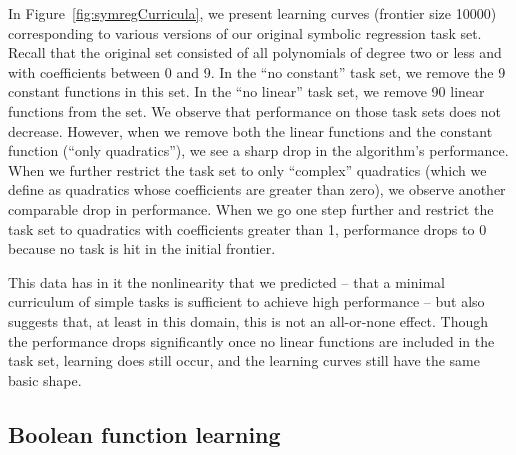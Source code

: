 \documentclass{article}
\begin{document}
In Figure~\ref{fig:symregCurricula}, we present learning curves
(frontier size 10000) corresponding to various versions of our
original symbolic regression task set. Recall that the original set
consisted of all polynomials of degree two or less and with
coefficients between 0 and 9. In the ``no constant'' task set, we
remove the 9 constant functions in this set. In the ``no linear'' task
set, we remove 90 linear functions from the set. We observe that
performance on those task sets does not decrease. However, when we
remove both the linear functions and the constant function (``only
quadratics''), we see a sharp drop in the algorithm's
performance. When we further restrict the task set to only ``complex''
quadratics (which we define as quadratics whose
coefficients are greater than zero), we observe another comparable
drop in performance. When we go one step further and restrict the task
set to quadratics with coefficients greater than 1, performance drops
to 0 because no task is hit in the initial frontier. 

This data has in it the nonlinearity that we predicted -- that a
minimal curriculum of simple tasks is sufficient to achieve high
performance -- but also suggests that, at least in this domain, this
is not an all-or-none effect. Though the performance drops
significantly once no linear functions are included in the task set,
learning does still occur, and the learning curves still have the same
basic shape. 



\subsection{Boolean function learning}
\label{sec:boolcircuits}
\end{document}
